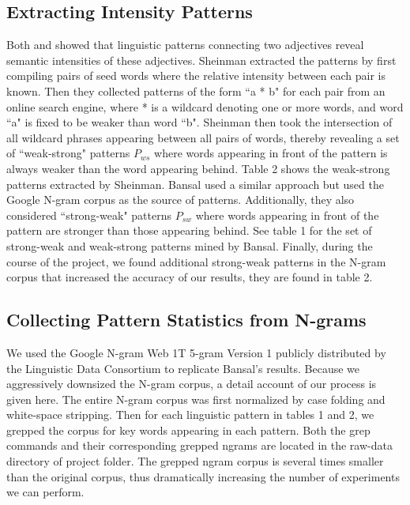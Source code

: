 \documentclass[11pt,letterpaper]{article}
\begin{document}
\subsection{Extracting Intensity Patterns}

Both  and  showed that linguistic patterns connecting two adjectives reveal semantic intensities of these adjectives. Sheinman extracted the patterns by first compiling pairs of seed words where the relative intensity between each pair is known.
Then they collected patterns of the form ``a * b" for each pair from an online search engine, where * is a wildcard denoting one or more words, and word ``a" is fixed to be weaker than word ``b". Sheinman then took the intersection of all wildcard phrases appearing between all pairs of words, thereby revealing a set of ``weak-strong" patterns $P_{ws}$ where words appearing in front of the pattern is always weaker than the word appearing behind. Table 2 shows the weak-strong patterns extracted by Sheinman. Bansal used a similar approach but used the Google N-gram corpus \cite{brants2006web} as the source of patterns. Additionally, they also considered ``strong-weak" patterns $P_{sw}$ where words appearing in front of the pattern are stronger than those appearing behind. See table 1 for the set of strong-weak and weak-strong patterns mined by Bansal. Finally, during the course of the project, we found additional strong-weak patterns in the N-gram corpus that increased the accuracy of our results, they are found in table 2.

\subsection{Collecting Pattern Statistics from N-grams}

We used the Google N-gram Web 1T 5-gram Version 1 publicly distributed by the Linguistic Data Consortium to replicate Bansal's results. Because we aggressively downsized the N-gram corpus, a detail account of our process is given here. The entire N-gram corpus was first normalized by case folding and white-space stripping. Then for each linguistic pattern in tables 1 and 2, we grepped the corpus for key words appearing in each pattern. Both the grep commands and their corresponding grepped ngrams are located in the raw-data directory of project folder. The grepped ngram corpus is several times smaller than the original corpus, thus dramatically increasing the number of experiments we can perform.
\end{document}
